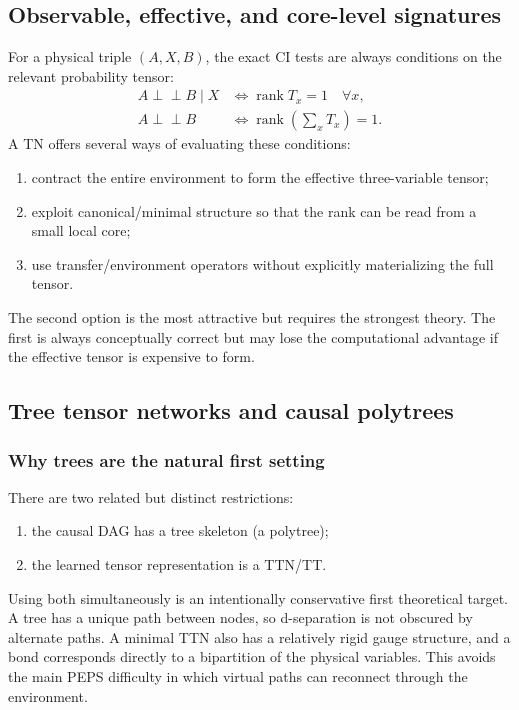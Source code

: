 \documentclass[11pt]{article}
\theoremstyle{remark}
\newcommand{\indep}{\perp\!\!\!\perp}
\newcommand{\rank}{\operatorname{rank}}
\begin{document}
\subsection{Observable, effective, and core-level signatures}

For a physical triple $(A,X,B)$, the exact CI tests are always conditions on the relevant probability tensor:
\begin{align}
A\indep B\mid X &\Longleftrightarrow \rank T_x=1\quad\forall x,\\
A\indep B &\Longleftrightarrow \rank\!\left(\sum_xT_x\right)=1.
\end{align}
A TN offers several ways of evaluating these conditions:
\begin{enumerate}
\item contract the entire environment to form the effective three-variable tensor;
\item exploit canonical/minimal structure so that the rank can be read from a small local core;
\item use transfer/environment operators without explicitly materializing the full tensor.
\end{enumerate}
The second option is the most attractive but requires the strongest theory. The first is always conceptually correct but may lose the computational advantage if the effective tensor is expensive to form.

\subsection{Tree tensor networks and causal polytrees}
\label{sec:analysis-trees}

\subsubsection{Why trees are the natural first setting}

There are two related but distinct restrictions:
\begin{enumerate}
\item the causal DAG has a tree skeleton (a polytree);
\item the learned tensor representation is a TTN/TT.
\end{enumerate}
Using both simultaneously is an intentionally conservative first theoretical target. A tree has a unique path between nodes, so d-separation is not obscured by alternate paths. A minimal TTN also has a relatively rigid gauge structure, and a bond corresponds directly to a bipartition of the physical variables. This avoids the main PEPS difficulty in which virtual paths can reconnect through the environment.
\end{document}

